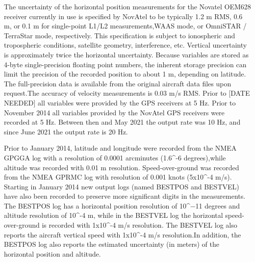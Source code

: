 \documentclass[
]{book}
\begin{document}
The uncertainty of the horizontal position measurements for the Novatel OEM628 receiver currently in use is specified by NovAtel to be typically 1.2 m RMS, 0.6 m, or 0.1 m for single-point L1/L2 measurements,WAAS mode, or OmniSTAR / TerraStar mode, respectively. This specification is subject to ionospheric and tropospheric conditions, satellite geometry, interference, etc. Vertical uncertainty is approximately twice the horizontal uncertainty. Because variables are stored as 4-byte single-precision floating point numbers, the inherent storage precision can limit the precision of the recorded position to about 1 m, depending on latitude. The full-precision data is available from the original aircraft data files upon request.The accuracy of velocity measurements is 0.03 m/s RMS. Prior to {[}DATE NEEDED{]} all variables were provided by the GPS receivers at 5 Hz. Prior to November 2014 all variables provided by the NovAtel GPS receivers were recorded at 5 Hz. Between then and May 2021 the output rate was 10 Hz, and since June 2021 the output rate is 20 Hz.

Prior to January 2014, latitude and longitude were recorded from the NMEA GPGGA log with a resolution of 0.0001 arcminutes (1.6\^{}-6 degrees),while altitude was recorded with 0.01 m resolution. Speed-over-ground was recorded from the NMEA GPRMC log with resolution of 0.001 knots (5x10\^{}-4 m/s). Starting in January 2014 new output logs (named BESTPOS and BESTVEL) have also been recorded to preserve more significant digits in the measurements. The BESTPOS log has a horizontal position resolution of 10\^{}−11 degrees and altitude resolution of 10\^{}-4 m, while in the BESTVEL log the horizontal speed-over-ground is recorded with 1x10\^{}-4 m/s resolution. The BESTVEL log also reports the aircraft vertical speed with 1x10\^{}-4 m/s resolution.In addition, the BESTPOS log also reports the estimated uncertainty (in meters) of the horizontal position and altitude.
\end{document}
